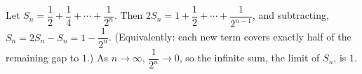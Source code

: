 Let $S_n=\dfrac12+\dfrac14+\cdots+\dfrac1{2^n}$. Then $2S_n=1+\dfrac12+\cdots+\dfrac1{2^{n-1}}$, and subtracting, $S_n=2S_n-S_n=1-\dfrac1{2^n}$. (Equivalently: each new term covers exactly half of the remaining gap to $1$.) As $n\to\infty$, $\dfrac1{2^n}\to0$, so the infinite sum, the limit of $S_n$, is $\boxed{1}$.
